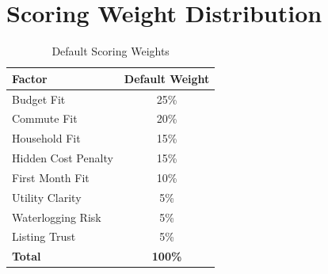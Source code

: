 \documentclass[12pt, a4paper, oneside]{report}
\begin{document}
\chapter{Scoring Weight Distribution}

\begin{table}[H]
\centering
\caption{Default Scoring Weights}
\begin{tabular}{l c}
\toprule
\textbf{Factor} & \textbf{Default Weight} \\
\midrule
Budget Fit & 25\% \\
Commute Fit & 20\% \\
Household Fit & 15\% \\
Hidden Cost Penalty & 15\% \\
First Month Fit & 10\% \\
Utility Clarity & 5\% \\
Waterlogging Risk & 5\% \\
Listing Trust & 5\% \\
\midrule
\textbf{Total} & \textbf{100\%} \\
\bottomrule
\end{tabular}
\end{table}


\end{document}
